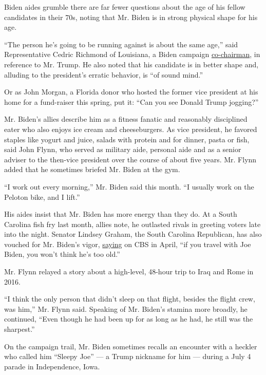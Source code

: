 Biden aides grumble there are far fewer questions about the age of his
fellow candidates in their 70s, noting that Mr. Biden is in strong
physical shape for his age.

``The person he's going to be running against is about the same age,''
said Representative Cedric Richmond of Louisiana, a Biden campaign
\href{https://www.nytimes.com/2019/05/31/us/politics/biden-cochair-cedric-richmond.html}{co-chairman},
in reference to Mr. Trump. He also noted that his candidate is in better
shape and, alluding to the president's erratic behavior, is ``of sound
mind.''

Or as John Morgan, a Florida donor who hosted the former vice president
at his home for a fund-raiser this spring, put it: ``Can you see Donald
Trump jogging?''

Mr. Biden's allies describe him as a fitness fanatic and reasonably
disciplined eater who also enjoys ice cream and cheeseburgers. As vice
president, he favored staples like yogurt and juice, salads with protein
and for dinner, pasta or fish, said John Flynn, who served as military
aide, personal aide and as a senior adviser to the then-vice president
over the course of about five years. Mr. Flynn added that he sometimes
briefed Mr. Biden at the gym.

``I work out every morning,'' Mr. Biden said this month. ``I usually
work on the Peloton bike, and I lift.''

His aides insist that Mr. Biden has more energy than they do. At a South
Carolina fish fry last month, allies note, he outlasted rivals in
greeting voters late into the night. Senator Lindsey Graham, the South
Carolina Republican, has also vouched for Mr. Biden's vigor,
\href{https://www.apnews.com/a9256c8194da4fc79424e9b41c1d6459}{saying}
on CBS in April, ``if you travel with Joe Biden, you won't think he's
too old.''

Mr. Flynn relayed a story about a high-level, 48-hour trip to Iraq and
Rome in 2016.

``I think the only person that didn't sleep on that flight, besides the
flight crew, was him,'' Mr. Flynn said. Speaking of Mr. Biden's stamina
more broadly, he continued, ``Even though he had been up for as long as
he had, he still was the sharpest.''

On the campaign trail, Mr. Biden sometimes recalls an encounter with a
heckler who called him ``Sleepy Joe'' --- a Trump nickname for him ---
during a July 4 parade in Independence, Iowa.

